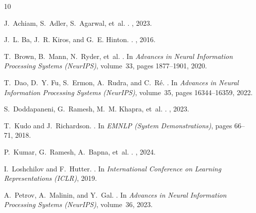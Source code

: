 \documentclass[10pt,twocolumn,letterpaper]{article}
\begin{document}
\begin{thebibliography}{10}

J.~Achiam, S.~Adler, S.~Agarwal, et~al.
.
, 2023.

J.~L. Ba, J.~R. Kiros, and G.~E. Hinton.
.
, 2016.

T.~Brown, B.~Mann, N.~Ryder, et~al.
.
\newblock In {\em Advances in Neural Information Processing Systems (NeurIPS)}, volume~33, pages 1877--1901, 2020.

T.~Dao, D.~Y. Fu, S.~Ermon, A.~Rudra, and C.~R{\'e}.
.
\newblock In {\em Advances in Neural Information Processing Systems (NeurIPS)}, volume~35, pages 16344--16359, 2022.

S.~Doddapaneni, G.~Ramesh, M.~M. Khapra, et~al.
.
, 2023.

T.~Kudo and J.~Richardson.
.
\newblock In {\em EMNLP (System Demonstrations)}, pages 66--71, 2018.

P.~Kumar, G.~Ramesh, A.~Bapna, et~al.
.
, 2024.

I.~Loshchilov and F.~Hutter.
.
\newblock In {\em International Conference on Learning Representations (ICLR)}, 2019.

A.~Petrov, A.~Malinin, and Y.~Gal.
.
\newblock In {\em Advances in Neural Information Processing Systems (NeurIPS)}, volume~36, 2023.


\end{thebibliography}
\end{document}
